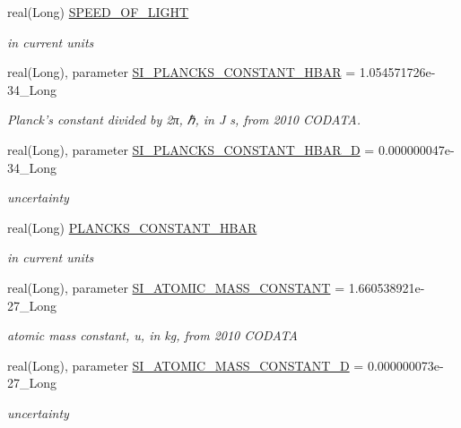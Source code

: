 \begin{DoxyCompactItemize}
real(Long) \hyperlink{namespacephys__cons_ac31faa4bb5e82aecbdffa3b3d43a1736}{SPEED\_\-OF\_\-LIGHT}
\begin{DoxyCompactList}\small\item\em in current units \item\end{DoxyCompactList}\item 
real(Long), parameter \hyperlink{namespacephys__cons_ab49e79c21c913c5857dedf2c555d2c21}{SI\_\-PLANCKS\_\-CONSTANT\_\-HBAR} = 1.054571726e-\/34\_\-Long
\begin{DoxyCompactList}\small\item\em Planck's constant divided by 2π, ℏ, in J s, from 2010 CODATA. \item\end{DoxyCompactList}\item 
real(Long), parameter \hyperlink{namespacephys__cons_af8ab82739d58ac3a1e1d9c97d3cfb4da}{SI\_\-PLANCKS\_\-CONSTANT\_\-HBAR\_\-D} = 0.000000047e-\/34\_\-Long
\begin{DoxyCompactList}\small\item\em uncertainty \item\end{DoxyCompactList}\item 
real(Long) \hyperlink{namespacephys__cons_af0b754235993060b14fc81b7d1f702a5}{PLANCKS\_\-CONSTANT\_\-HBAR}
\begin{DoxyCompactList}\small\item\em in current units \item\end{DoxyCompactList}\item 
real(Long), parameter \hyperlink{namespacephys__cons_a0a98df5d38297f3acc9d5557b4080055}{SI\_\-ATOMIC\_\-MASS\_\-CONSTANT} = 1.660538921e-\/27\_\-Long
\begin{DoxyCompactList}\small\item\em atomic mass constant, u, in kg, from 2010 CODATA \item\end{DoxyCompactList}\item 
real(Long), parameter \hyperlink{namespacephys__cons_a6e13c059ed2f1228592194ed5f16222c}{SI\_\-ATOMIC\_\-MASS\_\-CONSTANT\_\-D} = 0.000000073e-\/27\_\-Long
\begin{DoxyCompactList}\small\item\em uncertainty \item\end{DoxyCompactList}\item 

\end{DoxyCompactItemize}
